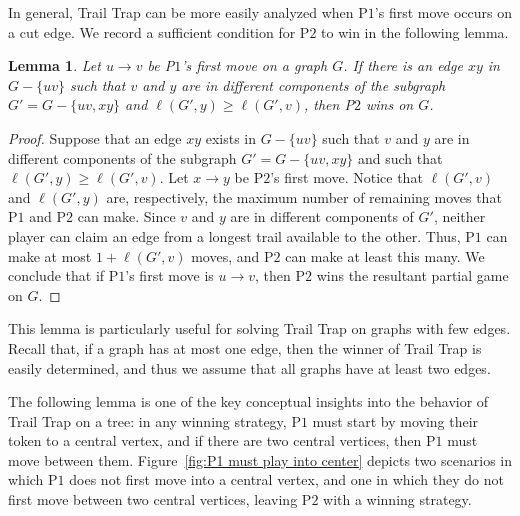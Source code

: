 \documentclass{article}
\theoremstyle{plain}
\newtheorem{lemma}[theorem]{Lemma}
\theoremstyle{definition}
\newcommand{\MaxTrail}{\ell}
\def\pone{{\rm{P}\ensuremath{1}}}
\def\ptwo{{\rm{P}\ensuremath{2}}}
\def\poneposs{{\rm{P}\ensuremath{1}'s}}
\def\ptwoposs{{\rm{P}\ensuremath{2}'s}}
\begin{document}
In general, {\sc Trail Trap} can be more easily analyzed when \poneposs{} first move occurs on a cut edge. We record a sufficient condition for \ptwo{} to win in the following lemma. 

\begin{lemma}\label{lem P2 and P1 never meet on a graph}
Let $u \to v$ be \poneposs{} first move on a graph $G$. If there is an edge $xy$ in $G - \{uv\}$ such that $v$ and $y$ are in different components of the subgraph $G' = G - \{uv,xy\}$ and $\MaxTrail(G',y) \geq \MaxTrail(G',v)$, then \ptwo{} wins on $G$.
\end{lemma}


\begin{proof}
    Suppose that an edge $xy$ exists in $G - \{uv\}$ such that $v$ and $y$ are in different components of the subgraph $G' = G - \{uv,xy\}$ and such that $\MaxTrail(G',y) \geq \MaxTrail(G',v)$.
    Let $x \to y$ be \ptwoposs{} first move.
    Notice that $ \MaxTrail{(G',v)}$ and $\MaxTrail{(G',y)}$ are, respectively, the maximum number of remaining moves that \pone{} and \ptwo{} can make. Since $v$ and $y$ are in different components of $G'$, neither player can claim an edge from a longest trail available to the other. Thus, \pone{} can make at most $1 + \MaxTrail{(G',v)}$ moves, and \ptwo{} can make at least this many. We conclude that if \poneposs{} first move is $u \to v$, then \ptwo{} wins the resultant partial game on $G$. 
\end{proof}

This lemma is particularly useful for solving {\sc Trail Trap} on graphs with few edges. Recall that, if a graph has at most one edge, then the winner of {\sc Trail Trap} is easily determined, and thus we assume that all graphs have at least two edges.
 

The following lemma is one of the key conceptual insights into the behavior of {\sc Trail Trap} on a tree: in any winning strategy, \pone{} must start by moving their token to a central vertex, and if there are two central vertices, then \pone{} must move between them.
Figure~\ref{fig:P1 must play into center} depicts two scenarios in which \pone{} does not first move into a central vertex, and one in which they do not first move between two central vertices, leaving \ptwo{} with a winning strategy.
\end{document}
